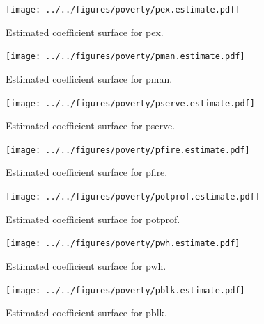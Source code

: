 \documentclass[authoryear, review, 11pt]{elsarticle}
\begin{document}
					
			\begin{figure}
				\begin{center}
					\texttt{[image: ../../figures/poverty/pex.estimate.pdf]}
					\caption{Estimated coefficient surface for pex.\label{fig:pex}}
				\end{center}
			\end{figure}
						
			
			\begin{figure}
				\begin{center}
					\texttt{[image: ../../figures/poverty/pman.estimate.pdf]}
					\caption{Estimated coefficient surface for pman.\label{fig:pman}}
				\end{center}
			\end{figure}
						
			
			\begin{figure}
				\begin{center}
					\texttt{[image: ../../figures/poverty/pserve.estimate.pdf]}
					\caption{Estimated coefficient surface for pserve.\label{fig:pserve}}
				\end{center}
			\end{figure}
						
			
			\begin{figure}
				\begin{center}
					\texttt{[image: ../../figures/poverty/pfire.estimate.pdf]}
					\caption{Estimated coefficient surface for pfire.\label{fig:pfire}}
				\end{center}
			\end{figure}
						
			
			\begin{figure}
				\begin{center}
					\texttt{[image: ../../figures/poverty/potprof.estimate.pdf]}
					\caption{Estimated coefficient surface for potprof.\label{fig:potprof}}
				\end{center}
			\end{figure}
			
			
			
			\begin{figure}
				\begin{center}
					\texttt{[image: ../../figures/poverty/pwh.estimate.pdf]}
					\caption{Estimated coefficient surface for pwh.\label{fig:pwh}}
				\end{center}
			\end{figure}
						
			
			\begin{figure}
				\begin{center}
					\texttt{[image: ../../figures/poverty/pblk.estimate.pdf]}
					\caption{Estimated coefficient surface for pblk.\label{fig:pblk}}
				\end{center}
			\end{figure}
						
\end{document}
